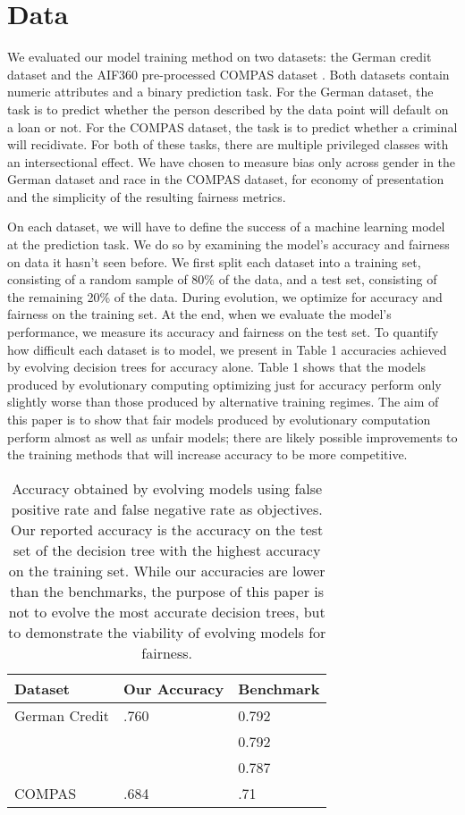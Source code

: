 \documentclass[twoside]{article}
\begin{document}
\section{Data}
We evaluated our model training method on two datasets: the German credit dataset \citep{Dua:2019} and the AIF360 pre-processed COMPAS dataset \citep{Larson:2016}. Both datasets contain numeric attributes and a binary prediction task. For the German dataset, the task is to predict whether the person described by the data point will default on a loan or not. For the COMPAS dataset, the task is to predict whether a criminal will recidivate. For both of these tasks, there are multiple privileged classes with an intersectional effect. We have chosen to measure bias only across gender in the German dataset and race in the COMPAS dataset, for economy of presentation and the simplicity of the resulting fairness metrics.

On each dataset, we will have to define the success of a machine learning model at the prediction task. We do so by examining the model’s accuracy and fairness on data it hasn’t seen before. We first split each dataset into a training set, consisting of a random sample of 80\% of the data, and a test set, consisting of the remaining 20\% of the data. During evolution, we optimize for accuracy and fairness on the training set. At the end, when we evaluate the model’s performance, we measure its accuracy and fairness on the test set. To quantify how difficult each dataset is to model, we present in Table 1 accuracies achieved by evolving decision trees for accuracy alone. Table 1 shows that the models produced by evolutionary computing optimizing just for accuracy perform only slightly worse than those produced by alternative training regimes. The aim of this paper is to show that fair models produced by evolutionary computation perform almost as well as unfair models; there are likely possible improvements to the training methods that will increase accuracy to be more competitive.

\renewcommand{\arraystretch}{1.5}
\begin{table}
	\begin{center}
	\begin{tabular}{| l | l | l |}
	\hline Dataset & Our Accuracy & Benchmark 
	\\ \hline German Credit & .760 & 0.792 \citep{Abellan:2017}
	\\ & & 0.792 \citep{Bao:2019}
	\\ & & 0.787 \citep{Shen:2019} 
	\\ \hline COMPAS & .684 & .71 \citep{Larson:2016}
	\\ \hline
	\end{tabular}
	\end{center}
\caption{Accuracy obtained by evolving models using false positive rate and false negative rate as objectives. Our reported accuracy is the accuracy on the test set of the decision tree with the highest accuracy on the training set. While our accuracies are lower than the benchmarks, the purpose of this paper is not to evolve the most accurate decision trees, but to demonstrate the viability of evolving models for fairness.}
\end{table}
\end{document}
